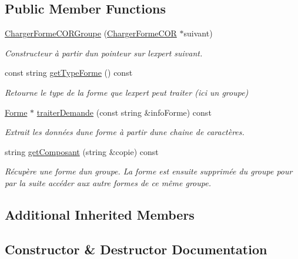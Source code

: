 \subsection*{Public Member Functions}
\begin{DoxyCompactItemize}
\item 
\hyperlink{class_charger_forme_c_o_r_groupe_a8af20b68260a8e445aeb0163631f6a66}{Charger\+Forme\+C\+O\+R\+Groupe} (\hyperlink{class_charger_forme_c_o_r}{Charger\+Forme\+C\+OR} $\ast$suivant)
\begin{DoxyCompactList}\small\item\em Constructeur à partir d\textquotesingle{}un pointeur sur l\textquotesingle{}expert suivant. \end{DoxyCompactList}\item 
const string \hyperlink{class_charger_forme_c_o_r_groupe_a202dfd1ec95bc7a20daeb66a92452a11}{get\+Type\+Forme} () const
\begin{DoxyCompactList}\small\item\em Retourne le type de la forme que l\textquotesingle{}expert peut traiter (ici un groupe) \end{DoxyCompactList}\item 
\hyperlink{class_forme}{Forme} $\ast$ \hyperlink{class_charger_forme_c_o_r_groupe_ab28f5a9e7a8fe306c98aa3f1f8b775e4}{traiter\+Demande} (const string \&info\+Forme) const
\begin{DoxyCompactList}\small\item\em Extrait les données d\textquotesingle{}une forme à partir d\textquotesingle{}une chaine de caractères. \end{DoxyCompactList}\item 
string \hyperlink{class_charger_forme_c_o_r_groupe_a6a9f6502bd3d05670a69c8eca418ce06}{get\+Composant} (string \&copie) const
\begin{DoxyCompactList}\small\item\em Récupère une forme d\textquotesingle{}un groupe. La forme est ensuite supprimée du groupe pour par la suite accéder aux autre formes de ce même groupe. \end{DoxyCompactList}\end{DoxyCompactItemize}
\subsection*{Additional Inherited Members}


\subsection{Constructor \& Destructor Documentation}
\mbox{\label{class_charger_forme_c_o_r_groupe_a8af20b68260a8e445aeb0163631f6a66}} 
